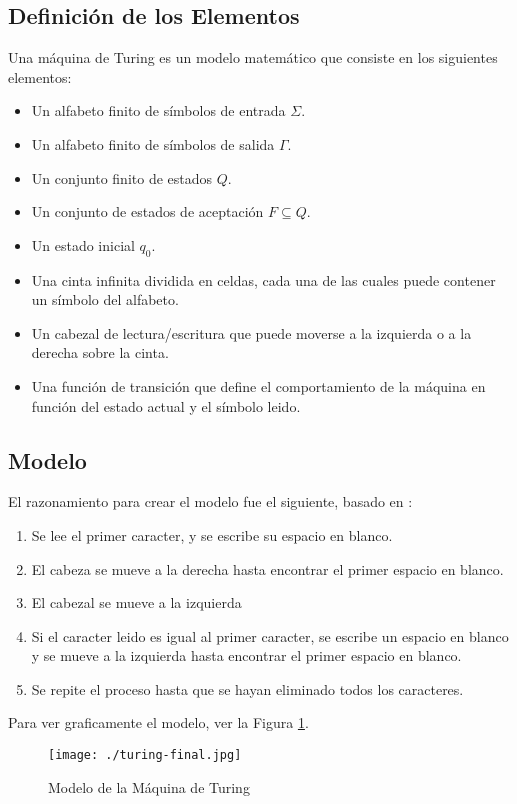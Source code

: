 \subsection{Definici\'on de los Elementos}
Una m\'aquina de Turing es un modelo matem\'atico que consiste en los siguientes elementos:
\begin{itemize}
	\item Un alfabeto finito de s\'imbolos de entrada $\Sigma$.
	\item Un alfabeto finito de s\'imbolos de salida $\Gamma$.
	\item Un conjunto finito de estados $Q$.
	\item Un conjunto de estados de aceptaci\'on $F \subseteq Q$.
	\item Un estado inicial $q_0$.
	\item Una cinta infinita dividida en celdas, cada una de las cuales puede contener un s\'imbolo del alfabeto.
	\item Un cabezal de lectura/escritura que puede moverse a la izquierda o a la derecha sobre la cinta.
	\item Una funci\'on de transici\'on que define el comportamiento de la m\'aquina en funci\'on del estado actual y el s\'imbolo leido.
\end{itemize}
\parencite{cohen1986}
\subsection{Modelo}
El razonamiento para crear el modelo fue el siguiente, basado en \textcite{palturing2017}:
\begin{enumerate}
  \item Se lee el primer caracter, y se escribe su espacio en blanco.
  \item El cabeza se mueve a la derecha hasta encontrar el primer espacio en blanco.
  \item El cabezal se mueve a la izquierda
  \item Si el caracter leido es igual al primer caracter, se escribe un espacio en blanco y se mueve a la izquierda hasta encontrar el primer espacio en blanco.
  \item Se repite el proceso hasta que se hayan eliminado todos los caracteres.
\end{enumerate}
Para ver graficamente el modelo, ver la Figura \ref{fig:turingmodel}.
\begin{figure}[h]
  \label{fig:turingmodel}
\begin{center}
  \texttt{[image: ./turing-final.jpg]}
\end{center}
\caption{Modelo de la M\'aquina de Turing}
\end{figure}
